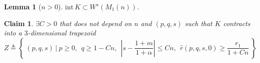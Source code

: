 \documentclass[a4paper,11pt]{article}
\newtheorem{lemma}{Lemma}[section]
\newtheorem{claim}{Claim}
\begin{document}
\begin{lemma}[$n>0$] \label{lem:3dstable}
$\textrm{int}\, K \subset W^s(M_1(n))$.
\end{lemma}
\begin{claim}
$\exists C>0$ that does not depend on $n$ and $(p,q,s)$ such that $K$ contracts into a $3$-dimensional trapezoid 
$$ Z\triangleq \left\{ \: (p,q,s) \: | \:  p\ge0, ~~ q\ge 1-Cn, ~~ \left|s-\frac{1+m}{1+\alpha}\right| \le Cn, ~~ \hat{r}(p,q,s,0)\ge \frac{r_1}{1+Cn}\: \right\}$$
\end{claim}
\end{document}
